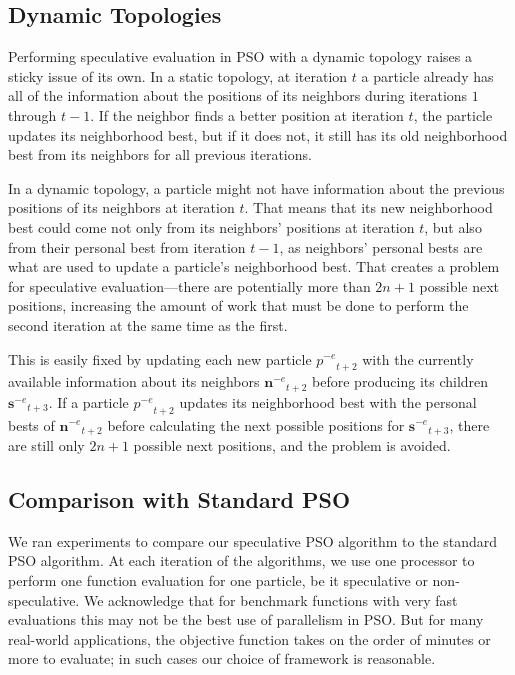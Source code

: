 \documentclass[journal,letterpaper]{IEEEtran}
\providecommand{\noeval}[1]{\ensuremath{#1^{-e}}}
\providecommand{\p}{\ensuremath{p}}
\providecommand{\sset}{\ensuremath{\mathbf{s}}}
\providecommand{\nset}{\ensuremath{\mathbf{n}}}
\begin{document}
\subsection{Dynamic Topologies}

Performing speculative evaluation in PSO with a dynamic topology raises a
sticky issue of its own.  In a static topology, at iteration $t$ a particle
already has all of the information about the positions of its neighbors during
iterations $1$ through $t-1$.  If the neighbor finds a better position at
iteration $t$, the particle updates its neighborhood best, but if it does not,
it still has its old neighborhood best from its neighbors for all previous
iterations.

In a dynamic topology, a particle might not have information about the previous
positions of its neighbors at iteration $t$.  That means that its new
neighborhood best could come not only from its neighbors' positions at
iteration $t$, but also from their personal best from iteration $t-1$, as
neighbors' personal bests are what are used to update a particle's neighborhood
best.  That creates a problem for speculative evaluation---there are
potentially more than $2n+1$ possible next positions, increasing the amount of
work that must be done to perform the second iteration at the same time as the
first.

This is easily fixed by updating each new particle $\noeval{\p}_{t+2}$ with the
currently available information about its neighbors $\noeval{\nset}_{t+2}$
before producing its children $\noeval{\sset}_{t+3}$.  If a particle
$\noeval{\p}_{t+2}$ updates its neighborhood best with the personal bests of
$\noeval{\nset}_{t+2}$ before calculating the next possible positions for
$\noeval{\sset}_{t+3}$, there are still only $2n+1$ possible next positions,
and the problem is avoided.

\subsection{Comparison with Standard PSO}
\label{sec:results}

We ran experiments to compare our speculative PSO algorithm to the standard PSO
algorithm.  At each iteration of the algorithms, we use one processor to
perform one function evaluation for one particle, be it speculative or
non-speculative.  We acknowledge that for benchmark functions with very fast
evaluations this may not be the best use of parallelism in PSO.  But for many
real-world applications, the objective function takes on the order of minutes
or more to evaluate; in such cases our choice of framework is reasonable.
\end{document}
